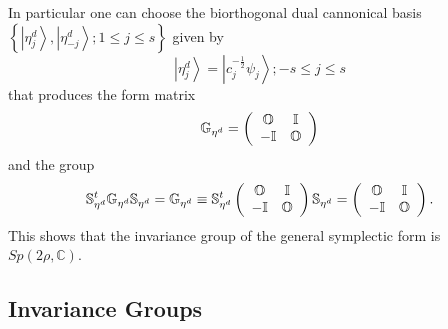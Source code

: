 \documentclass[aps,preprint]{revtex4}%
\begin{document}
In particular one can choose the biorthogonal dual cannonical basis $\left\{
\left\vert \eta_{j}^{d}\right\rangle ,\left\vert \eta_{-j}^{d}\right\rangle
;1\leq j\leq s\right\}  $ given by
\begin{equation}
\left\vert \eta_{j}^{d}\right\rangle =\left\vert c_{j}^{-\frac{1}{2}}\psi
_{j}\right\rangle ;-s\leq j\leq s
\end{equation}
that produces the form matrix
\begin{equation}
\mathbb{G}_{\eta^{d}}=\left(
\begin{array}
[c]{cc}%
\mathbb{O} & \mathbb{I}\\
-\mathbb{I} & \mathbb{O}%
\end{array}
\right)
\end{equation}
and the group
\begin{equation}
\mathbb{S}_{\eta^{d}}^{t}\mathbb{G}_{\eta^{d}}\mathbb{S}_{\eta^{d}}%
=\mathbb{G}_{\eta^{d}}\equiv\mathbb{S}_{\eta^{d}}^{t}\left(
\begin{array}
[c]{cc}%
\mathbb{O} & \mathbb{I}\\
-\mathbb{I} & \mathbb{O}%
\end{array}
\right)  \mathbb{S}_{\eta^{d}}=\left(
\begin{array}
[c]{cc}%
\mathbb{O} & \mathbb{I}\\
-\mathbb{I} & \mathbb{O}%
\end{array}
\right)  .
\end{equation}
This shows that the invariance group of the general symplectic form is
$Sp\left(  2\rho,\mathbb{C}\right)  .$

\subsection{Invariance Groups}
\end{document}
